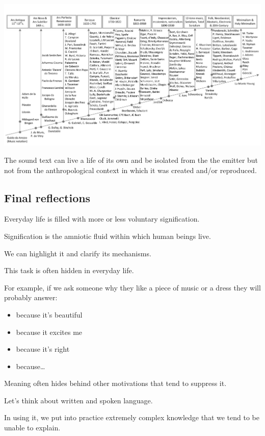 \begin{center}
\includegraphics[scale=1]{../img/lineatempo.png}
\end{center}

The sound text can live a life of its own and be isolated from the the emitter but not from the anthropological context in which it was created and/or reproduced.

\subsection{Final reflections}\label{final-reflections}

Everyday life is filled with more or less voluntary signification.

Signification is the amniotic fluid within which human beings live.

We can highlight it and clarify its mechanisms.

This task is often hidden in everyday life.

For example, if we ask someone why they like a piece of music or a dress they will probably answer:

\begin{itemize}
\tightlist
\item because it's beautiful
\item because it excites me
\item because it's right
\item because\ldots{}
\end{itemize}

Meaning often hides behind other motivations that tend to suppress it.

Let's think about written and spoken language.

In using it, we put into practice extremely complex knowledge that we tend to be unable to explain.

